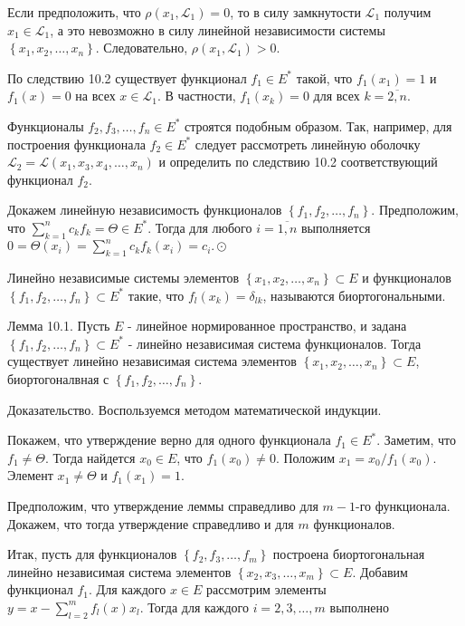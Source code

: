 Если предположить, что $\rho\left(x_{1}, \mathcal{L}_{1}\right)=0$, то в силу замкнутости $\mathcal{L}_{1}$ получим $x_{1} \in \mathcal{L}_{1}$, а это невозможно в силу линейной независимости системы $\left\{x_{1}, x_{2}, \ldots, x_{n}\right\}$. Следовательно, $\rho\left(x_{1}, \mathcal{L}_{1}\right)>0$.

По следствию 10.2 существует функционал $f_{1} \in E^{*}$ такой, что $f_{1}\left(x_{1}\right)=1$ и $f_{1}(x)=0$ на всех $x \in \mathcal{L}_{1}$. В частности, $f_{1}\left(x_{k}\right)=0$ для всех $k=\overline{2, n}$.

Функционалы $f_{2}, f_{3}, \ldots, f_{n} \in E^{*}$ строятся подобным образом. Так, например, для построения функционала $f_{2} \in E^{*}$ следует рассмотреть линейную оболочку $\mathcal{L}_{2}=\mathscr{L}\left(x_{1}, x_{3}, x_{4}, \ldots, x_{n}\right)$ и определить по следствию 10.2 соответствующий функционал $f_{2}$.

Докажем линейную независимость функционалов $\left\{f_{1}, f_{2}, \ldots, f_{n}\right\}$. Предположим, что $\sum_{k=1}^{n} c_{k} f_{k}=\Theta \in E^{*}$. Тогда для любого $i=\overline{1, n}$ выполняется $0=\Theta\left(x_{i}\right)=\sum_{k=1}^{n} c_{k} f_{k}\left(x_{i}\right)=c_{i} . \odot$

Линейно независимые системы элементов $\left\{x_{1}, x_{2}, \ldots, x_{n}\right\} \subset E$ и функционалов $\left\{f_{1}, f_{2}, \ldots, f_{n}\right\} \subset E^{*}$ такие, что $f_{l}\left(x_{k}\right)=\delta_{l k}$, называются биортогональными.

Лемма 10.1. Пусть $E$ - линейное нормированное пространство, и задана $\left\{f_{1}, f_{2}, \ldots, f_{n}\right\} \subset E^{*}$ - линейно независимая система функционалов. Тогда существует линейно независимая система элементов $\left\{x_{1}, x_{2}, \ldots, x_{n}\right\} \subset E$, биортогоналвная с $\left\{f_{1}, f_{2}, \ldots, f_{n}\right\}$.

Доказательство. Воспользуемся методом математической индукции.

Покажем, что утверждение верно для одного функционала $f_{1} \in E^{*}$. Заметим, что $f_{1} \neq \Theta$. Тогда найдется $x_{0} \in E$, что $f_{1}\left(x_{0}\right) \neq 0$. Положим $x_{1}=x_{0} / f_{1}\left(x_{0}\right)$. Элемент $x_{1} \neq \Theta$ и $f_{1}\left(x_{1}\right)=1$.

Предположим, что утверждение леммы справедливо для $m-1$-го функционала. Докажем, что тогда утверждение справедливо и для $m$ функционалов.

Итак, пусть для функционалов $\left\{f_{2}, f_{3}, \ldots, f_{m}\right\}$ построена биортогональная линейно независимая система элементов $\left\{x_{2}, x_{3}, \ldots, x_{m}\right\} \subset E$. Добавим функционал $f_{1}$. Для каждого $x \in E$ рассмотрим элементы $y=x-\sum_{l=2}^{m} f_{l}(x) x_{l}$. Тогда для каждого $i=2,3, \ldots, m$ выполнено


